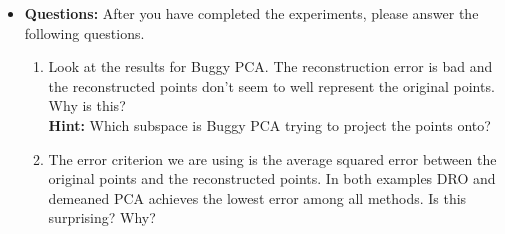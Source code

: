 \documentclass[a4paper]{article}
\theoremstyle{definition}
\begin{document}
\begin{itemize}
\item \textbf{Questions:} After you have completed the experiments, please answer the following questions.
\begin{enumerate}
\item Look at the results for Buggy PCA. The reconstruction error is bad and the
reconstructed points don't seem to well represent the original points. Why is
this? \\
\textbf{Hint: } Which subspace is Buggy PCA trying to project the points
onto?
\item The error criterion we are using is the average squared error 
between the original points and the reconstructed points.
In both examples DRO and demeaned PCA achieves the lowest error among all
methods. 
Is this surprising? Why?
\end{enumerate}


\end{itemize}
\end{document}

